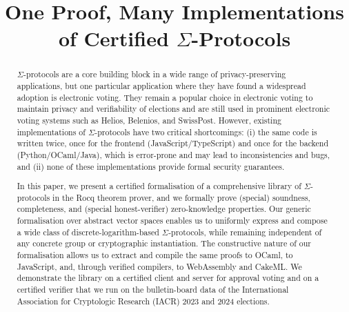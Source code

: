 \documentclass[sigconf,anonymous,review]{acmart}
\begin{document}
\title{One Proof, Many Implementations of Certified $\Sigma$-Protocols}




\begin{abstract}
  $\Sigma$-protocols are a core building block in a wide range of privacy-preserving applications, but 
  one particular application where they have found a widespread adoption is electronic voting.
  They remain a popular choice in electronic voting to maintain privacy 
  and verifiability of elections and are still used in prominent electronic voting systems such as 
  Helios, Belenios, and SwissPost. However, existing implementations of $\Sigma$-protocols have two 
  critical shortcomings: (i) the same code is written twice, once for the frontend (JavaScript/TypeScript)
  and once for the backend (Python/OCaml/Java), which is error-prone and may lead to inconsistencies and bugs, and (ii) none of these implementations provide formal security guarantees.
  
  In this paper, we present a certified formalisation of a comprehensive library of $\Sigma$-protocols 
  in the Rocq theorem prover, and we formally prove (special) soundness, completeness, and 
  (special honest-verifier) zero-knowledge properties. Our generic formalisation over abstract vector spaces enables us to uniformly express and compose a wide class of discrete-logarithm-based $\Sigma$-protocols, while remaining independent of any concrete group or cryptographic instantiation. The constructive nature of our formalisation allows us to extract and compile the same proofs to OCaml, to JavaScript, and, through verified compilers, to WebAssembly and CakeML. We demonstrate the library on a certified client and server for approval voting and on a certified verifier that we run on the bulletin-board data of the International Association for Cryptologic Research (IACR) 2023 and 2024 elections. 
\end{abstract}
\end{document}
